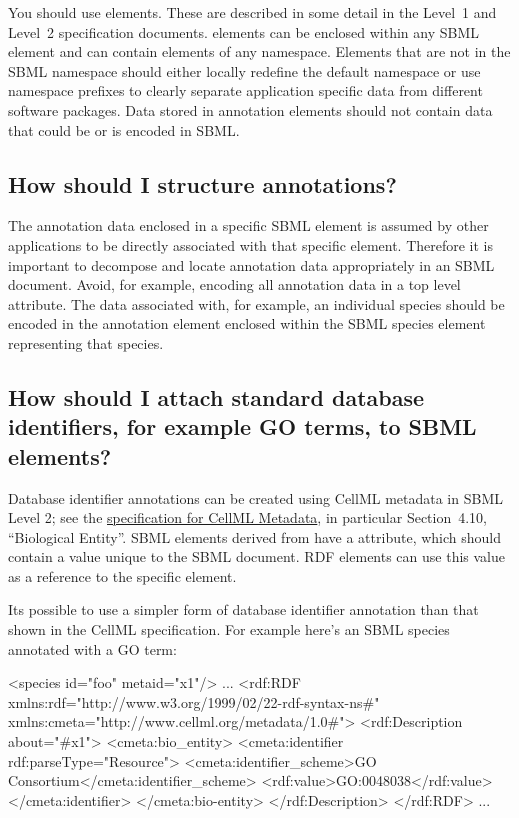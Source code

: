 \documentclass{sbmlfaq}
\begin{document}
You should use  elements.  These are described in some detail in the Level~1 and Level~2
specification documents.   elements can be enclosed within any SBML element and can contain
elements of any namespace. Elements that are not in the SBML namespace should either locally redefine the default namespace
or use namespace prefixes to clearly separate application specific data from different software packages.
Data stored in annotation elements should not contain data that could be or is encoded in SBML.  

\subsection{How should I structure annotations?}

The annotation data enclosed in a specific SBML element is
assumed by other applications to be directly associated with that specific element.
Therefore it is important to decompose and locate annotation data appropriately in an SBML document.
Avoid, for example, encoding all annotation data in a top level attribute.
The data associated
with, for example, an individual species should be encoded in the annotation element enclosed within
the SBML species element representing that species.

\subsection{How should I attach standard database identifiers, for example GO terms, to SBML elements?}

Database identifier annotations can be created using CellML metadata in
SBML Level 2; see the
\href{http://www.cellml.com/public/metadata/cellml_metadata_specification.html}{specification
  for CellML Metadata}, in particular Section~4.10, ``Biological Entity''.
SBML elements derived from  have a  attribute,
which should contain a value unique to the SBML document.  RDF elements can
use this value as a reference to the specific element.

Its possible to use a simpler form of database identifier annotation than that shown
in the CellML specification.  For example here's an SBML species annotated with a GO term:

\begin{example}
<species id="foo" metaid="x1"/>
...
<rdf:RDF xmlns:rdf="http://www.w3.org/1999/02/22-rdf-syntax-ns#"
         xmlns:cmeta="http://www.cellml.org/metadata/1.0#">
  <rdf:Description about="#x1">
    <cmeta:bio_entity>
         <cmeta:identifier rdf:parseType="Resource">
            <cmeta:identifier_scheme>GO Consortium</cmeta:identifier_scheme>
            <rdf:value>GO:0048038</rdf:value>
          </cmeta:identifier>   
    </cmeta:bio-entity>
  </rdf:Description>
</rdf:RDF> 
...
\end{example}
\end{document}
